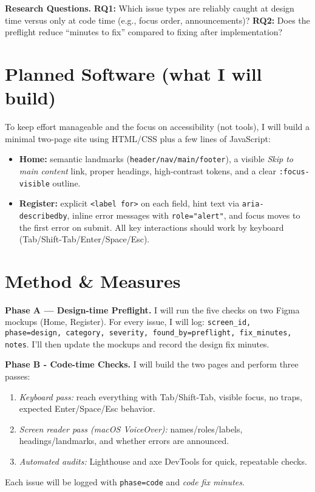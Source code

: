 \documentclass[12pt]{article}
\begin{document}
\textbf{Research Questions.} 
\textbf{RQ1:} Which issue types are reliably caught at design time versus only at code time (e.g., focus order, announcements)? 
\textbf{RQ2:} Does the preflight reduce “minutes to fix” compared to fixing after implementation?

\section*{Planned Software (what I will build)}
To keep effort manageable and the focus on accessibility (not tools), I will build a minimal two-page site using HTML/CSS plus a few lines of JavaScript:
\begin{itemize}
  \item \textbf{Home:} semantic landmarks (\texttt{header/nav/main/footer}), a visible \emph{Skip to main content} link, proper headings, high-contrast tokens, and a clear \texttt{:focus-visible} outline.
  \item \textbf{Register:} explicit \texttt{<label for>} on each field, hint text via \texttt{aria-describedby}, inline error messages with \texttt{role="alert"}, and focus moves to the first error on submit. All key interactions should work by keyboard (Tab/Shift-Tab/Enter/Space/Esc).
\end{itemize}

\section*{Method \& Measures}
\textbf{Phase A — Design-time Preflight.} I will run the five checks on two Figma mockups (Home, Register). For every issue, I will log: \texttt{screen\_id, phase=design, category, severity, found\_by=preflight, fix\_minutes, notes}. I'll then update the mockups and record the design fix minutes.

\textbf{Phase B - Code-time Checks.} I will build the two pages and perform three passes:
\begin{enumerate}
  \item \emph{Keyboard pass:} reach everything with Tab/Shift-Tab, visible focus, no traps, expected Enter/Space/Esc behavior.
  \item \emph{Screen reader pass (macOS VoiceOver):} names/roles/labels, headings/landmarks, and whether errors are announced.
  \item \emph{Automated audits:} Lighthouse and axe DevTools for quick, repeatable checks.
\end{enumerate}
Each issue will be logged with \texttt{phase=code} and \emph{code fix minutes}. 
\end{document}
